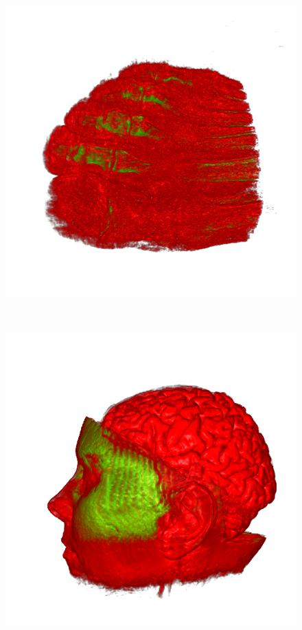 \begin{figure}
\begin{minipage}{.15\textwidth}
	\includegraphics[width=1\linewidth]{images/foot_naive}
\end{minipage}~
\begin{minipage}{.15\textwidth}
	\includegraphics[width=1\linewidth]{images/MRbrain_naive}

\end{minipage}
\end{figure}

